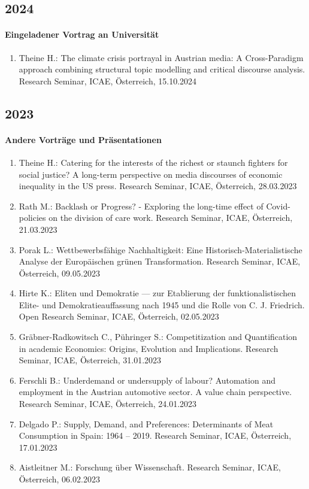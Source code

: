 \subsection*{2024}
\paragraph{Eingeladener Vortrag an Universität}
\begin{enumerate}
	\item Theine H.: The climate crisis portrayal in Austrian media:  A Cross-Paradigm approach combining structural topic modelling and critical discourse analysis. Research Seminar, ICAE, Österreich, 15.10.2024
\end{enumerate}
\subsection*{2023}
\paragraph{Andere Vorträge und Präsentationen}
\begin{enumerate}
	\item Theine H.: Catering for the interests of the richest or staunch fighters for social justice? A long-term perspective on media discourses of economic inequality in the US press. Research Seminar, ICAE, Österreich, 28.03.2023
	\item Rath M.: Backlash or Progress? - Exploring the long-time effect of Covid-policies on the division of care work. Research Seminar, ICAE, Österreich, 21.03.2023
	\item Porak L.: Wettbewerbsfähige Nachhaltigkeit: Eine Historisch-Materialistische Analyse der Europäischen grünen Transformation. Research Seminar, ICAE, Österreich, 09.05.2023
	\item Hirte K.: Eliten und Demokratie — zur Etablierung der funktionalistischen Elite- und Demokratieauffassung nach 1945 und die Rolle von C. J. Friedrich. Open Research Seminar, ICAE, Österreich, 02.05.2023
	\item Gräbner-Radkowitsch C., Pühringer S.: Competitization and Quantification in academic Economics: Origins, Evolution and Implications. Research Seminar, ICAE, Österreich, 31.01.2023
	\item Ferschli B.: Underdemand or undersupply of labour? Automation and employment in the Austrian automotive sector. A value chain perspective. Research Seminar, ICAE, Österreich, 24.01.2023
	\item Delgado P.: Supply, Demand, and Preferences: Determinants of Meat Consumption in Spain: 1964 – 2019. Research Seminar, ICAE, Österreich, 17.01.2023
	\item Aistleitner M.: Forschung über Wissenschaft. Research Seminar, ICAE, Österreich, 06.02.2023
\end{enumerate}
